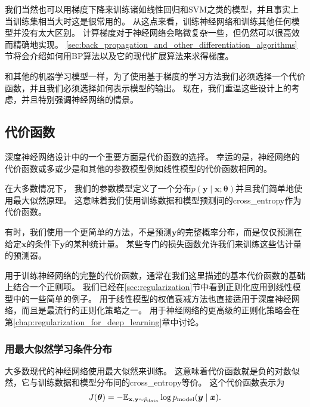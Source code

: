 
我们当然也可以用梯度下降来训练诸如线性回归和\gls{SVM}之类的模型，并且事实上当训练集相当大时这是很常用的。
从这点来看，训练神经网络和训练其他任何模型并没有太大区别。
计算梯度对于神经网络会略微复杂一些，但仍然可以很高效而精确地实现。
\ref{sec:back_propagation_and_other_differentiation_algorithms}节将会介绍如何用\gls{BP}算法以及它的现代扩展算法来求得梯度。

和其他的机器学习模型一样，为了使用基于梯度的学习方法我们必须选择一个代价函数，并且我们必须选择如何表示模型的输出。
现在，我们重温这些设计上的考虑，并且特别强调神经网络的情景。

\subsection{代价函数}
\label{sec:cost_functions}

深度神经网络设计中的一个重要方面是代价函数的选择。
幸运的是，神经网络的代价函数或多或少是和其他的参数模型例如线性模型的代价函数相同的。

在大多数情况下， 我们的参数模型定义了一个分布$p(\bm{y}\mid\bm{x};\bm{\theta})$并且我们简单地使用最大似然原理。
这意味着我们使用训练数据和模型预测间的\gls{cross_entropy}作为代价函数。

有时，我们使用一个更简单的方法，不是预测$\bm{y}$的完整概率分布，而是仅仅预测在给定$\bm{x}$的条件下$\bm{y}$的某种统计量。
某些专门的损失函数允许我们来训练这些估计量的预测器。

用于训练神经网络的完整的代价函数，通常在我们这里描述的基本代价函数的基础上结合一个正则项。
我们已经在\ref{sec:regularization}节中看到正则化应用到线性模型中的一些简单的例子。
用于线性模型的权值衰减方法也直接适用于深度神经网络，而且是最流行的正则化策略之一。
用于神经网络的更高级的正则化策略会在第\ref{chap:regularization_for_deep_learning}章中讨论。


\subsubsection{用最大似然学习条件分布}
\label{sec:learning_conditional_distributions_with_maximum_likelihood}

大多数现代的神经网络使用最大似然来训练。
这意味着代价函数就是负的对数似然，它与训练数据和模型分布间的\gls{cross_entropy}等价。
这个代价函数表示为
\begin{equation}
J(\bm{\theta}) = -\mathbb{E}_{\mathbf{x}, \mathbf{y} \sim \hat{p}_\text{data}} \log p_\text{model} (\bm{y} \mid \bm{x}).
\end{equation}

